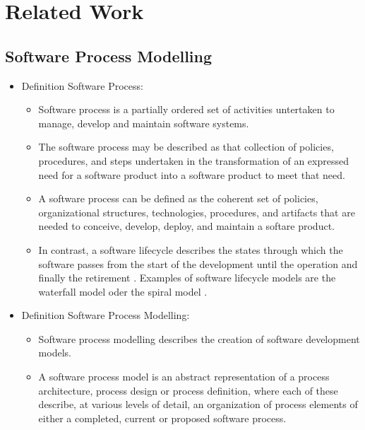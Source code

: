 
\section{Related Work}
\label{sec:ch6_related_work}

\subsection{Software Process Modelling}

\begin{itemize}
	\item Definition Software Process: 
	\begin{itemize}
		\item Software process is a partially ordered set of activities untertaken to manage, develop and maintain software systems. \citep{Acuna:2001aa}
		\item The software process may be described as that collection of policies, procedures, and steps undertaken in the transformation of an expressed need for a software product into a software product to meet that need. \citep{McChesney:1995aa}
		\item A software process can be defined as the coherent set of policies, organizational structures, technologies, procedures, and artifacts that are needed to conceive, develop, deploy, and maintain a softare product. \citep{Fuggetta:2000ds}
		\item In contrast, a software lifecycle describes the states through which the software passes from the start of the development until the operation and finally the retirement \citep{Acuna:aa}. Examples of software lifecycle models are the waterfall model \citep{Royce:1987tl} oder the spiral model \citep{Boehm:1988cd}.
	\end{itemize}
	\item Definition Software Process Modelling: 
	\begin{itemize}
		\item Software process modelling describes the creation of software development models. \citep{Acuna:2001aa}
		\item A software process model is an abstract representation  of a process architecture, process design or process definition, where each of these describe, at various levels of detail, an organization of process elements of either a completed, current or proposed software process. \citep{Feiler:1993aa}

\end{itemize}
\end{itemize}
